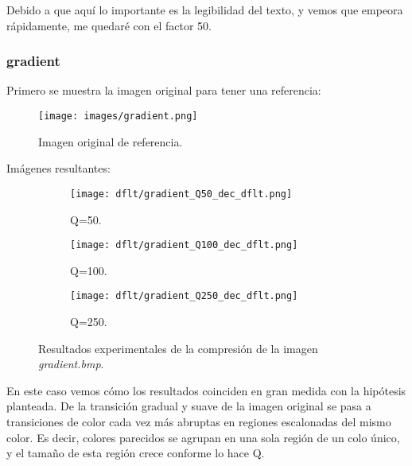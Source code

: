\documentclass[12pt,a4paper]{article}
\begin{document}
Debido a que aquí lo importante es la legibilidad del texto, y vemos que empeora rápidamente, me quedaré con el factor 50.\\

\subsubsection{gradient}
Primero se muestra la imagen original para tener una referencia:
\begin{figure}[H]
    \centering
    \texttt{[image: images/gradient.png]}
    \caption[Referencia - gradient]{Imagen original de referencia.}
    
\end{figure}
    
    \vspace{0.5cm}

Imágenes resultantes:
\begin{figure}[H]
    
    \begin{subfigure}{0.25\textwidth}
        \centering
        \texttt{[image: dflt/gradient\_Q50\_dec\_dflt.png]}
        \caption{Q=50.}
        
    \end{subfigure}
    \hfill
    \begin{subfigure}{0.25\textwidth}
        \centering
        \texttt{[image: dflt/gradient\_Q100\_dec\_dflt.png]}
        \caption{Q=100.}
        
    \end{subfigure}
    \hfill
    \begin{subfigure}{0.25\textwidth}
        \centering
        \texttt{[image: dflt/gradient\_Q250\_dec\_dflt.png]}
        \caption{Q=250.}
        
    \end{subfigure}
    
    
    \caption[Resultados experimentales - gradient]{Resultados experimentales de la compresión de la imagen \textit{gradient.bmp}.}
    
\end{figure}

En este caso vemos cómo los resultados coinciden en gran medida con la hipótesis planteada. De la transición gradual y suave de la imagen original se pasa a transiciones de color cada vez más abruptas en regiones escalonadas del mismo color. Es decir, colores parecidos se agrupan en una sola región de un colo único, y el tamaño de esta región crece conforme lo hace Q.\\
\end{document}
